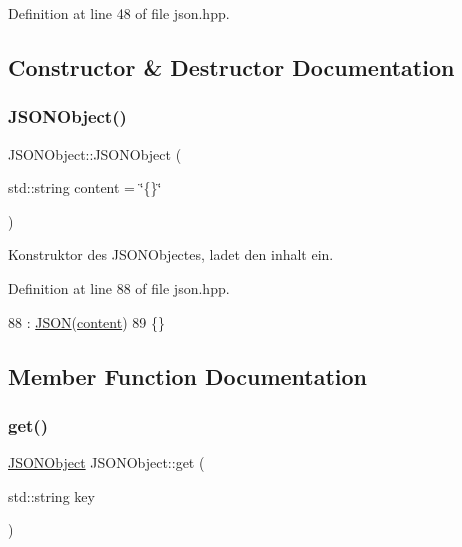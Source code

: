 Definition at line 48 of file json.\+hpp.



\subsection{Constructor \& Destructor Documentation}
\mbox{\label{class_j_s_o_n_object_a88fb28a2f166ecc545ae94f170ddd0ab}} 
\subsubsection{\texorpdfstring{J\+S\+O\+N\+Object()}{JSONObject()}}
{\footnotesize\ttfamily J\+S\+O\+N\+Object\+::\+J\+S\+O\+N\+Object (\begin{DoxyParamCaption}\item[{std\+::string}]{content = {\ttfamily \char`\"{}\{\}\char`\"{}} }\end{DoxyParamCaption})\hspace{0.3cm}{\ttfamily [inline]}}

Konstruktor des J\+S\+O\+N\+Objectes, ladet den inhalt ein. 

Definition at line 88 of file json.\+hpp.


\begin{DoxyCode}
88                                                : \mbox{\hyperlink{class_j_s_o_n_ae9b8a305b1bdc0aa66d096b226e1d7bb}{JSON}}(\mbox{\hyperlink{class_j_s_o_n_ad1ace77234b963a2994178ce7f76a181}{content}})
89 \{\}
\end{DoxyCode}


\subsection{Member Function Documentation}
\mbox{\label{class_j_s_o_n_object_ac2dd3ddb61b11a3ad800b09b41ac1562}} 
\subsubsection{\texorpdfstring{get()}{get()}}
{\footnotesize\ttfamily \mbox{\hyperlink{class_j_s_o_n_object}{J\+S\+O\+N\+Object}} J\+S\+O\+N\+Object\+::get (\begin{DoxyParamCaption}\item[{std\+::string}]{key }\end{DoxyParamCaption})\hspace{0.3cm}{\ttfamily [inline]}}

